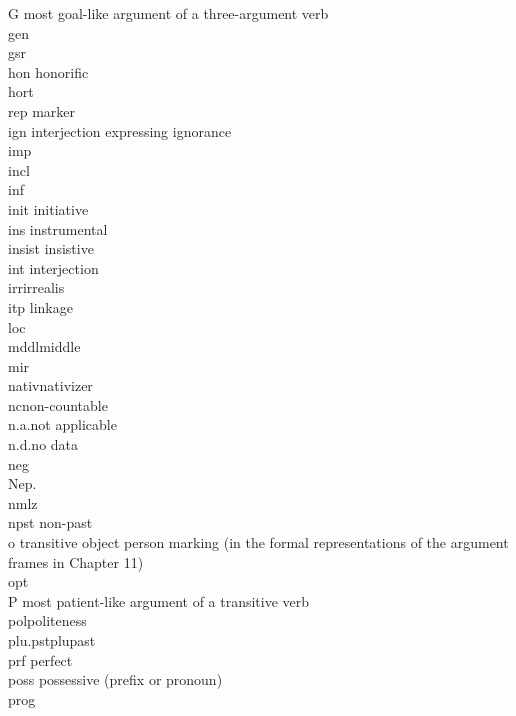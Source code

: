 \begin{refsection}
{\begin{tabbing}
G \> most goal-like argument of a three-argument verb\\
{\sc gen} \> \\
{\sc gsr} \> \\
{\sc hon}\> honorific\\
{\sc hort} \> \\
{\sc rep}\>  marker\\
{\sc ign}\>  interjection expressing ignorance\\
{\sc imp} \> \\
{\sc incl}\> \\
{\sc inf} \> \\
{\sc init} \> initiative\\
{\sc ins} \> instrumental\\
{\sc insist} \> insistive\\
{\sc int} \> interjection\\
{\sc irr}\>irrealis\\
{\sc itp} \>  linkage\\
{\sc loc} 	 \>  \\
{\sc mddl}\>middle\\
{\sc mir} \> \\
{\sc nativ}\>nativizer\\
{\sc nc}\>non-countable\\
n.a.\>not applicable\\
n.d.\>no data\\
{\sc neg} \>	\\
Nep. \>	\\
{\sc nmlz} \>	\\
{\sc npst} \> non-past\\
o		\> transitive object person marking (in the formal representations of the argument frames in Chapter 11)\\
{\sc opt} \> \\
P 	\> most patient-like argument of a transitive verb\\
{\sc pol}\>politeness\\
{\sc plu.pst}\>plupast\\
{\sc prf}\> perfect \\
{\sc poss} \> possessive (prefix or pronoun)\\
{\sc prog} \> \\

\end{tabbing}}
\end{refsection}
